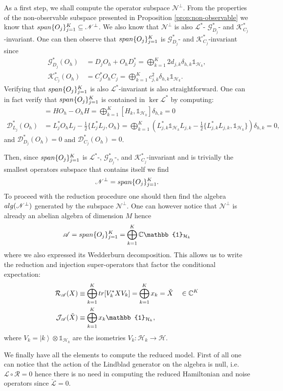 \documentclass[aihp,12pt]{imsart}
\newcommand{\Dc}{\mathcal{D}}
\newcommand{\Gc}{\mathcal{G}}
\newcommand{\Hc}{\mathcal{H}}
\newcommand{\Jc}{\mathcal{J}}
\newcommand{\Rc}{\mathcal{R}}
\newcommand{\Kc}{\mathcal{K}}
\newcommand{\Lc}{\mathcal{L}}
\newcommand{\As}{\mathscr{A}}
\newcommand{\Ns}{\mathscr{N}}
\newcommand{\Cb}{\mathbb{C}}
\newcommand{\one}{\mathbb{1}}
\newcommand{\tr}{{\rm tr}}
\newcommand{\Span}{{\rm span}}
\newcommand{\alg}{{\rm alg}}
\newcommand{\ket}[1]{\left| #1 \right>}
\theoremstyle{theorem}
\theoremstyle{definition}
\theoremstyle{remark}
\begin{document}
As a first step, we shall compute the operator subspace $\Ns^\perp$. From the properties of the non-observable subspace presented in Proposition \ref{prop:non-observable} we know that $\Span\{O_j\}_{j=1}^K\subseteq\Ns^\perp$. We also know that $\Ns^\perp$ is also $\Lc^*$- $\Gc_{D_j}^*$- and $\Kc_{C_j}^*$-invariant. One can then observe that $\Span\{O_j\}_{j=1}^K$ is $\Gc_{D_j}^*$- and $\Kc_{C_j}^*$-invariant since 
\begin{align*}
    \Gc_{D_j}^*(O_h) &= D_j O_h + O_h D_j^* = \bigoplus_{k=1}^K 2d_{j,k}\delta_{h,k}\one_{\Hc_k},\\
    \Kc_{C_j}^*(O_h) &= C_j^* O_h C_j = \bigoplus_{k=1}^K c_{j,k}^2\delta_{h,k}\one_{\Hc_k}.
\end{align*}
Verifying that $\Span\{O_j\}_{j=1}^K$ is also $\Lc^*$-invariant is also straightforward. One can in fact verify that $\Span\{O_j\}_{j=1}^K$ is contained in $\ker\Lc^*$ by computing:
\begin{align*}
    [H,O_h] &= HO_h - O_hH = \bigoplus_{k=1}^K [H_k, \one_{\Hc_k}]\delta_{h,k} = 0\\
    \Dc_{L_j}^*(O_h) &= L_j^* O_h L_j -\frac{1}{2}\{L_j^* L_j, O_h\} = \bigoplus_{k=1}^K (L_{j,k}^* \one_{\Hc_k} L_{j,k} - \frac{1}{2} \{L_{j,k}^*  L_{j,k}, \one_{\Hc_k}\} )\delta_{h,k}=0,
\end{align*}
and $\Dc_{D_j}^*(O_h) = 0$ and $\Dc_{C_j}^*(O_h)=0$.

Then, since $\Span\{O_j\}_{j=1}^K$ is $\Lc^*$-, $\Gc_{D_j}^*$-, and $\Kc_{C_j}^*$-invariant and is trivially the smallest operators subspace that contains itself we find
\[\Ns^\perp = \Span\{O_j\}_{j=1}^K. \]
To proceed with the reduction procedure one should then find the algebra $\alg(\Ns^\perp)$ generated by the subspace $\Ns^\perp$. One can however notice that $\Ns^\perp$ is already an abelian algebra of dimension $M$ hence \[\As = \Span\{O_j\}_{j=1}^K = \bigoplus_{k=1}^K \Cb  \one_{\Hc_k}\]
where we also expressed its Wedderburn decomposition. This allows us to write the reduction and injection super-operators that factor the conditional expectation:
\begin{align*}
    \Rc_\As(X) &\equiv \bigoplus_{k=1}^K \tr[ V_k^* X V_k]  = \bigoplus_{k=1}^K x_k = \check{X} \quad \in\Cb^K \\
    \Jc_\As(\check{X}) &\equiv \bigoplus_{k=1}^K x_k \one_{\Hc_k},
\end{align*}
where $V_k = \ket{k} \otimes \one_{\Hc_k}$ are the isometries $V_k:\Hc_k\to\Hc$. 

We finally have all the elements to compute the reduced model. 
First of all one can notice that the action of the Lindblad generator on the algebra is null, i.e. $\Lc\circ\Rc = 0$ hence there is no need in computing the reduced Hamiltonian and noise operators since $\check{\Lc}=0$.
\end{document}
